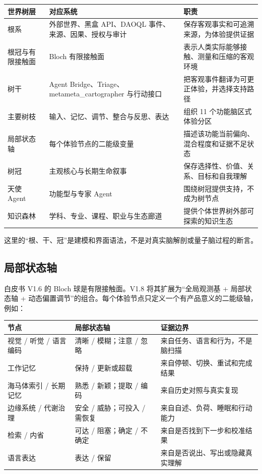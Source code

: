\documentclass[UTF8,a4paper,11pt]{ctexart}
\begin{document}
\begin{center}
\begin{longtable}{@{}p{3.2cm}p{5.1cm}p{5.0cm}@{}}
\toprule
\textbf{世界树层} & \textbf{对应系统} & \textbf{职责} \\
\midrule
根系 & 外部世界、黑盒 API、DAOQL 事件、来源、因果、授权与审计 & 保存客观事实和可追溯来源，为体验提供证据 \\
根冠与有限接触面 & Bloch 有限接触面 & 表示人类实际能够接触、测量和压缩的客观环境 \\
树干 & Agent Bridge、Triage、metameta\_cartographer 与行动接口 & 把客观事件翻译为可更正体验，并选择支持路径 \\
主要树枝 & 输入、记忆、调节、整合与反思、表达 & 组织 11 个功能脑区式体验分区 \\
局部状态轴 & 每个体验节点的二能级变量 & 描述该功能当前偏向、混合程度和证据不足状态 \\
树冠 & 主观核心与长期生命叙事 & 保存选择性、价值、关系、目标和自我理解 \\
天使 Agent & 功能型与专家 Agent & 围绕树冠提供支持，不成为树节点 \\
知识森林 & 学科、专业、课程、职业与生态廊道 & 提供个体世界树外部可探索的知识生态 \\
\bottomrule
\end{longtable}
\end{center}

这里的“根、干、冠”是建模和界面语法，不是对真实脑解剖或量子脑过程的断言。

\subsection{局部状态轴}

白皮书 V1.6 的 Bloch 球是有限接触面。V1.8 将其扩展为“全局观测基 + 局部状态轴 + 动态偏置调节”的组合。每个体验节点只定义一个有产品意义的二能级轴，例如：

\begin{center}
\begin{longtable}{@{}p{4.3cm}p{4.0cm}p{5.0cm}@{}}
\toprule
\textbf{节点} & \textbf{局部状态轴} & \textbf{证据边界} \\
\midrule
视觉 / 听觉 / 语言编码 & 清晰 / 模糊；注意 / 忽略 & 来自任务、语言和行为，不是脑扫描 \\
工作记忆 & 保持 / 更新或超载 & 来自停顿、切换、重试和完成结果 \\
海马体索引 / 长期记忆 & 熟悉 / 新颖；提取 / 编码 & 来自历史对照与真实复现 \\
边缘系统 / 代谢治理 & 安全 / 威胁；可投入 / 需恢复 & 来自自述、负荷、睡眠和行动能力 \\
检索 / 内省 & 可达 / 阻塞；确定 / 不确定 & 来自是否找到下一步和校准结果 \\
语言表达 & 表达 / 保留 & 来自是否说出、写出或隐藏真实理解 \\
\bottomrule
\end{longtable}
\end{center}
\end{document}
